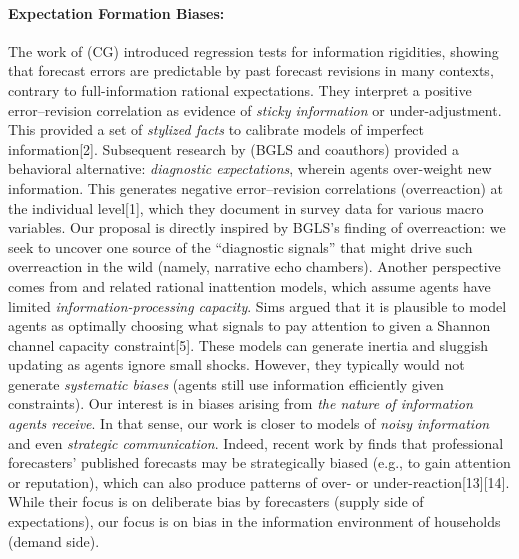 \documentclass[12pt]{article}
\begin{document}
\paragraph{Expectation Formation Biases:} The work of \citet{Coibion2015} (CG) introduced regression tests for information rigidities, showing that forecast errors are predictable by past forecast revisions in many contexts, contrary to full-information rational expectations. They interpret a positive error--revision correlation as evidence of \emph{sticky information} or under-adjustment. This provided a set of \textit{stylized facts} to calibrate models of imperfect information[2]. Subsequent research by \citet{Bordalo2018Diagnostic, Bordalo2020NE} (BGLS and coauthors) provided a behavioral alternative: \textit{diagnostic expectations}, wherein agents over-weight new information. This generates negative error--revision correlations (overreaction) at the individual level[1], which they document in survey data for various macro variables. Our proposal is directly inspired by BGLS's finding of overreaction: we seek to uncover one source of the ``diagnostic signals'' that might drive such overreaction in the wild (namely, narrative echo chambers).
Another perspective comes from \citet{Sims2003} and related rational inattention models, which assume agents have limited \textit{information-processing capacity}. Sims argued that it is plausible to model agents as optimally choosing what signals to pay attention to given a Shannon channel capacity constraint[5]. These models can generate inertia and sluggish updating as agents ignore small shocks. However, they typically would not generate \emph{systematic biases} (agents still use information efficiently given constraints). Our interest is in biases arising from \emph{the nature of information agents receive}. In that sense, our work is closer to models of \emph{noisy information} and even \emph{strategic communication}. Indeed, recent work by \citet{Andre2023biasedforecasts} finds that professional forecasters' published forecasts may be strategically biased (e.g., to gain attention or reputation), which can also produce patterns of over- or under-reaction[13][14]. While their focus is on deliberate bias by forecasters (supply side of expectations), our focus is on bias in the information environment of households (demand side).
\end{document}
